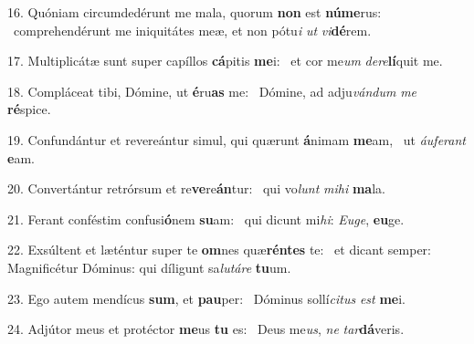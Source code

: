 16. Quóniam circumdedérunt me mala, quorum \textbf{non} est \textbf{nú}\textbf{me}rus: \ast\  comprehendérunt me iniquitátes meæ, et non pótu\textit{i} \textit{ut} \textit{vi}\textbf{dé}rem.\

17. Multiplicátæ sunt super capíllos \textbf{cá}pitis \textbf{me}i: \ast\  et cor me\textit{um} \textit{de}\textit{re}\textbf{lí}quit me.\

18. Compláceat tibi, Dómine, ut \textbf{é}ru\textbf{as} me: \ast\  Dómine, ad adju\textit{ván}\textit{dum} \textit{me} \textbf{ré}spice.\

19. Confundántur et revereántur simul, qui quærunt \textbf{á}nimam \textbf{me}am, \ast\  ut \textit{áu}\textit{fe}\textit{rant} \textbf{e}am.\

20. Convertántur retrórsum et re\textbf{ve}re\textbf{án}tur: \ast\  qui vo\textit{lunt} \textit{mi}\textit{hi} \textbf{ma}la.\

21. Ferant conféstim confusi\textbf{ó}nem \textbf{su}am: \ast\  qui dicunt mi\textit{hi}: \textit{Eu}\textit{ge}, \textbf{eu}ge.\

22. Exsúltent et læténtur super te \textbf{om}nes quæ\textbf{rén}\textbf{tes} te: \ast\  et dicant semper: Magnificétur Dóminus: qui díligunt sa\textit{lu}\textit{tá}\textit{re} \textbf{tu}um.\

23. Ego autem mendícus \textbf{sum}, et \textbf{pau}per: \ast\  Dóminus sollí\textit{ci}\textit{tus} \textit{est} \textbf{me}i.\

24. Adjútor meus et protéctor \textbf{me}us \textbf{tu} es: \ast\  Deus me\textit{us}, \textit{ne} \textit{tar}\textbf{dá}veris.\

